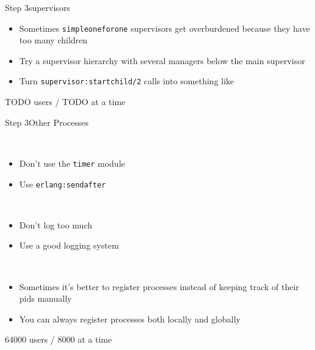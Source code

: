 \documentclass[utf8]{beamer}
\begin{document}
\begin{frame}{Step 3}{supervisors}
	\begin{itemize}
		\item Sometimes \texttt{simple\textunderscore one\textunderscore for\textunderscore one} supervisors get \alert{overburdened} because they have too many children
		\item Try a supervisor hierarchy with several managers below the main supervisor
		\item Turn \texttt{supervisor:start\textunderscore child/2} calls into something like
		\startchild
	\end{itemize}
\end{frame}

\begin{frame}
TODO users / TODO at a time
\end{frame}

\begin{frame}{Step 3}{Other Processes}
	\begin{description}
		\item<+->[Timers]\ \\
			\begin{itemize}
				\item Don't use the \texttt{timer} module
				\item Use \texttt{erlang:send\textunderscore after}
			\end{itemize}
		\item<+->[Logging]\ \\
			\begin{itemize}
				\item Don't log too much
				\item Use a good logging system
			\end{itemize}
		\item<+->[Registration]\ \\
			\begin{itemize}
				\item Sometimes it's better to register processes instead of keeping track of their pids manually
				\item You can always register processes \alert{both} locally and globally
			\end{itemize}
	\end{description}
\end{frame}

\begin{frame}
64000 users / 8000 at a time
\end{frame}
\end{document}
